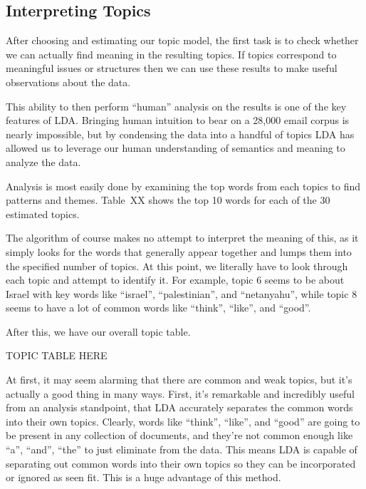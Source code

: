 \documentclass[12pt]{article}
\theoremstyle{definition}
\theoremstyle{algodesc}
\begin{document}
\subsection{Interpreting Topics}

After choosing and estimating our topic model, the first task is to check whether we can actually find meaning in the resulting topics. If topics correspond to meaningful issues or structures then we can use these results to make useful observations about the data.

This ability to then perform ``human'' analysis on the results is one of the key features of LDA. Bringing human intuition to bear on a 28,000 email corpus is nearly impossible, but by condensing the data into a handful of topics LDA has allowed us to leverage our human understanding of semantics and meaning to analyze the data.

Analysis is most easily done by examining the top words from each topics to find patterns and themes. Table~XX shows the top 10 words for each of the 30 estimated topics.

The algorithm of course makes no attempt to interpret the meaning of this, as it simply looks for the words that generally appear together and lumps them into the specified number of topics.  At this point, we literally have to look through each topic and attempt to identify it.  For example, topic 6 seems to be about Israel with key words like ``israel'', ``palestinian'', and ``netanyahu'', while topic 8 seems to have a lot of common words like ``think'', ``like'', and ``good''.

After this, we have our overall topic table.

TOPIC TABLE HERE

At first, it may seem alarming that there are common and weak topics, but it's actually a good thing in many ways.  First, it's remarkable and incredibly useful from an analysis standpoint, that LDA accurately separates the common words into their own topics.  Clearly, words like ``think'', ``like'', and ``good'' are going to be present in any collection of documents, and they're not common enough like ``a'', ``and'', ``the'' to just eliminate from the data.  This means LDA is capable of separating out common words into their own topics so they can be incorporated or ignored as seen fit.  This is a huge advantage of this method.
\end{document}
